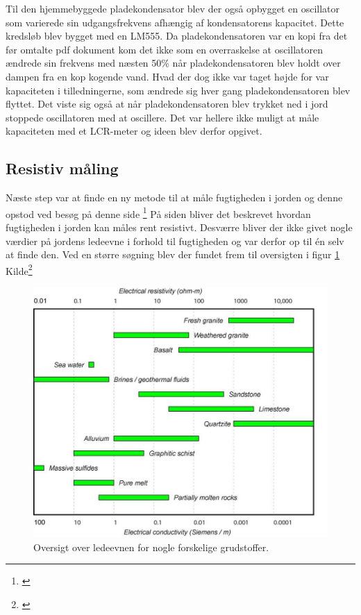 Til den hjemmebyggede pladekondensator blev der også opbygget en oscillator som varierede sin udgangsfrekvens afhængig af kondensatorens kapacitet. Dette kredsløb blev bygget med en LM555. Da pladekondensatoren var en kopi fra det før omtalte pdf dokument kom det ikke som en overraskelse at oscillatoren ændrede sin frekvens med næsten 50\% når pladekondensatoren blev holdt over dampen fra en kop kogende vand. Hvad der dog ikke var taget højde for var kapaciteten i tilledningerne, som ændrede sig hver gang pladekondensatoren blev flyttet. Det viste sig også at når pladekondensatoren blev trykket ned i jord stoppede oscillatoren med at oscillere. Det var hellere ikke muligt at måle kapaciteten med et LCR-meter og ideen blev derfor opgivet.\newline

\subsection{Resistiv måling}
Næste step var at finde en ny metode til at måle fugtigheden i jorden og denne opstod ved besøg på denne side \footnote{\citet{gardenbot:soilmoisture}} På siden bliver det beskrevet hvordan fugtigheden i jorden kan måles rent resistivt. Desværre bliver der ikke givet nogle værdier på jordens ledeevne i forhold til fugtigheden og var derfor op til én selv at finde den. Ved en større søgning blev der fundet frem til oversigten i figur \ref{photo:Ledeevne_grundstoffer} Kilde\footnote{\citet{zonge:soilpermability}}

\begin{figure}[H]
	\centering 
	\includegraphics[scale=0.5]{HardwareArkitektur/Sensore/Jordfugt_billeder/soil_conductivity_types.JPG}
	\caption{Oversigt over ledeevnen for nogle forskelige grudstoffer.}
	\label{photo:Ledeevne_grundstoffer}
\end{figure}

